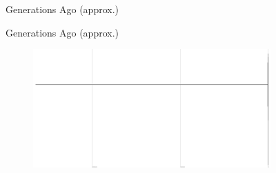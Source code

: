 \begin{figure}
  \begin{minipage}{0.5\columnwidth}
    \centering
    Generations Ago (approx.)
  \end{minipage}
  \hfill
  \begin{minipage}{0.5\columnwidth}
    \centering
    Generations Ago (approx.)
  \end{minipage}
  \begin{minipage}{0.5\columnwidth}
    \hspace{0.02\linewidth}
    \hfill
    \hfill
    \hfill
    \hfill
  \end{minipage}
  \hfill
  \begin{minipage}{0.5\columnwidth}
    \hspace{0.02\linewidth}
    \hfill
    \hfill
    \hfill
    \hfill
  \end{minipage}
  \hfill
  \begin{subfigure}[b]{0.5\columnwidth}
    \includegraphics[height=0.12\textheight,width=\textwidth]{img/perfect-tree-phylogenies-log/epoch=7+resolution=3+treatment=2/a=collapsed-phylogeny+epoch=00007+mut_distn=np.random.standard_normal+num_generations=32768+num_islands=1+num_niches=1+p_island_migration=0.01+p_niche_invasion=3.0517578125e-08+population_size=32768+r.../eplicate=0+tournament_size=4+treatment=2+_generation=262144+_index=2+scale=nonlog+ext=.pdf}

\end{subfigure}
\end{figure}
